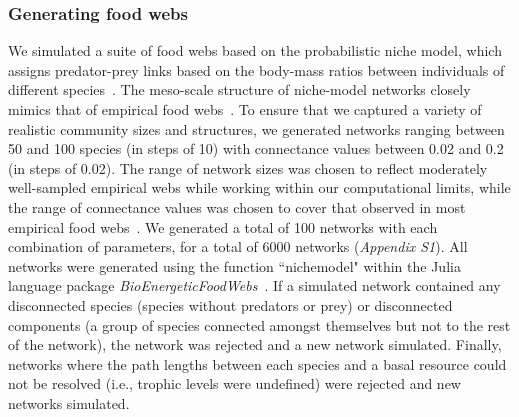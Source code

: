 \documentclass[12pt]{article}
\begin{document}
\begin{spacing}{1.0}
    	\subsubsection*{Generating food webs}
    
    		We simulated a suite of food webs based on the probabilistic niche model, which assigns predator-prey links based on the body-mass ratios between individuals of different species~\citep{Williams2000,Delmas2017}. The meso-scale structure of niche-model networks closely mimics that of empirical food webs~\citep{Stouffer2007}. To ensure that we captured a variety of realistic community sizes and structures, we generated networks ranging between 50 and 100 species (in steps of 10) with connectance values between 0.02 and 0.2 (in steps of 0.02). The range of network sizes was chosen to reflect moderately well-sampled empirical webs while working within our computational limits, while the range of connectance values was chosen to cover that observed in most empirical food webs~\citep{Dunne2002}. We generated a total of 100 networks with each combination of parameters, for a total of 6000 networks (\emph{Appendix S1}). All networks were generated using the function ``nichemodel" within the Julia language package \emph{BioEnergeticFoodWebs}~\citep{bioenergeticfw,Delmas2017}. If a simulated network contained any disconnected species (species without predators or prey) or disconnected components (a group of species connected amongst themselves but not to the rest of the network), the network was rejected and a new network simulated. Finally, networks where the path lengths between each species and a basal resource could not be resolved (i.e., trophic levels were undefined) were rejected and new networks simulated.
    

\end{spacing}
\end{document}
